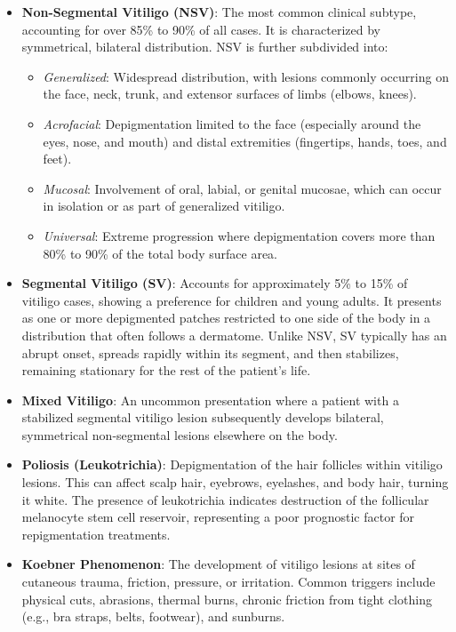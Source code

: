 \begin{itemize}
    \item \textbf{Non-Segmental Vitiligo (NSV)}: The most common clinical subtype, accounting for over 85\% to 90\% of all cases. It is characterized by symmetrical, bilateral distribution. NSV is further subdivided into:
    \begin{itemize}
        \item \textit{Generalized}: Widespread distribution, with lesions commonly occurring on the face, neck, trunk, and extensor surfaces of limbs (elbows, knees).
        \item \textit{Acrofacial}: Depigmentation limited to the face (especially around the eyes, nose, and mouth) and distal extremities (fingertips, hands, toes, and feet).
        \item \textit{Mucosal}: Involvement of oral, labial, or genital mucosae, which can occur in isolation or as part of generalized vitiligo.
        \item \textit{Universal}: Extreme progression where depigmentation covers more than 80\% to 90\% of the total body surface area.
    \end{itemize}
    \item \textbf{Segmental Vitiligo (SV)}: Accounts for approximately 5\% to 15\% of vitiligo cases, showing a preference for children and young adults. It presents as one or more depigmented patches restricted to one side of the body in a distribution that often follows a dermatome. Unlike NSV, SV typically has an abrupt onset, spreads rapidly within its segment, and then stabilizes, remaining stationary for the rest of the patient's life.
    \item \textbf{Mixed Vitiligo}: An uncommon presentation where a patient with a stabilized segmental vitiligo lesion subsequently develops bilateral, symmetrical non-segmental lesions elsewhere on the body.
    \item \textbf{Poliosis (Leukotrichia)}: Depigmentation of the hair follicles within vitiligo lesions. This can affect scalp hair, eyebrows, eyelashes, and body hair, turning it white. The presence of leukotrichia indicates destruction of the follicular melanocyte stem cell reservoir, representing a poor prognostic factor for repigmentation treatments.
    \item \textbf{Koebner Phenomenon}: The development of vitiligo lesions at sites of cutaneous trauma, friction, pressure, or irritation. Common triggers include physical cuts, abrasions, thermal burns, chronic friction from tight clothing (e.g., bra straps, belts, footwear), and sunburns.

\end{itemize}
